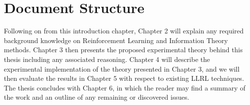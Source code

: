 \section{Document Structure}
Following on from this introduction chapter, Chapter 2 will explain any required background knowledge on Reinforcement Learning and Information Theory methods. Chapter 3 then presents the proposed experimental theory behind this thesis including any associated reasoning. Chapter 4 will describe the experimental implementation of the theory presented in Chapter 3, and we will then evaluate the results in Chapter 5 with respect to existing LLRL techniques. The thesis concludes with Chapter 6, in which the reader may find a summary of the work and an outline of any remaining or discovered issues.
